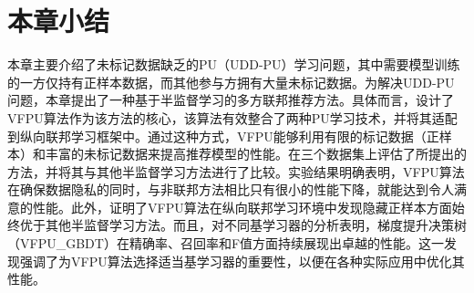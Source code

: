 \section{本章小结}
本章主要介绍了未标记数据缺乏的PU（UDD-PU）学习问题，其中需要模型训练的一方仅持有正样本数据，而其他参与方拥有大量未标记数据。为解决UDD-PU问题，本章提出了一种基于半监督学习的多方联邦推荐方法。具体而言，设计了VFPU算法作为该方法的核心，该算法有效整合了两种PU学习技术，并将其适配到纵向联邦学习框架中。通过这种方式，VFPU能够利用有限的标记数据（正样本）和丰富的未标记数据来提高推荐模型的性能。在三个数据集上评估了所提出的方法，并将其与其他半监督学习方法进行了比较。实验结果明确表明，VFPU算法在确保数据隐私的同时，与非联邦方法相比只有很小的性能下降，就能达到令人满意的性能。此外，证明了VFPU算法在纵向联邦学习环境中发现隐藏正样本方面始终优于其他半监督学习方法。而且，对不同基学习器的分析表明，梯度提升决策树（VFPU\_GBDT）在精确率、召回率和F值方面持续展现出卓越的性能。这一发现强调了为VFPU算法选择适当基学习器的重要性，以便在各种实际应用中优化其性能。